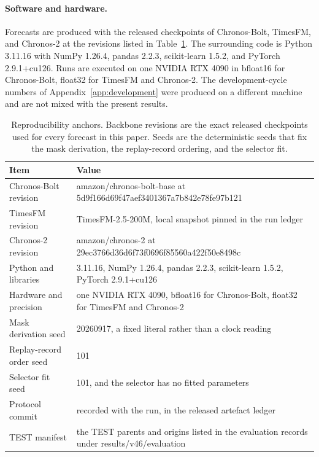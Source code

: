 \documentclass{article}
\begin{document}
\paragraph{Software and hardware.} Forecasts are produced with the released checkpoints of
Chronos-Bolt, TimesFM, and Chronos-2 at the revisions listed in Table~\ref{tab:app-repro}.
The surrounding code is Python 3.11.16 with NumPy 1.26.4, pandas
2.2.3, scikit-learn 1.5.2, and PyTorch 2.9.1+cu126. Runs are
executed on one NVIDIA RTX 4090 in bfloat16 for Chronos-Bolt, float32 for TimesFM and Chronos-2. The development-cycle numbers of
Appendix~\ref{app:development} were produced on a different machine and are not mixed with the
present results.

\begin{table}[h]
  \caption{Reproducibility anchors. Backbone revisions are the exact released checkpoints used
  for every forecast in this paper. Seeds are the deterministic seeds that fix the mask
  derivation, the replay-record ordering, and the selector fit.}
  \label{tab:app-repro}
  \centering
  \small
  \setlength{\tabcolsep}{4pt}
  \begin{tabular}{@{}l p{}@{}}
    \toprule
    Item & Value \\
    \midrule
    Chronos-Bolt revision   & amazon/chronos-bolt-base at 5d9f166d69f47aef3401367a7b842e78fe97b121 \\
    TimesFM revision        & TimesFM-2.5-200M, local snapshot pinned in the run ledger \\
    Chronos-2 revision      & amazon/chronos-2 at 29ec3766d36d6f73f0696f85560a422f50e8498c \\
    Python and libraries    & 3.11.16, NumPy 1.26.4, pandas 2.2.3, scikit-learn 1.5.2, PyTorch 2.9.1+cu126 \\
    Hardware and precision  & one NVIDIA RTX 4090, bfloat16 for Chronos-Bolt, float32 for TimesFM and Chronos-2 \\
    Mask derivation seed    & 20260917, a fixed literal rather than a clock reading \\
    Replay-record order seed & 101 \\
    Selector fit seed       & 101, and the selector has no fitted parameters \\
    Protocol commit         & recorded with the run, in the released artefact ledger \\
    TEST manifest           & the TEST parents and origins listed in the evaluation records under results/v46/evaluation \\
    \bottomrule
  \end{tabular}
\end{table}
\end{document}
